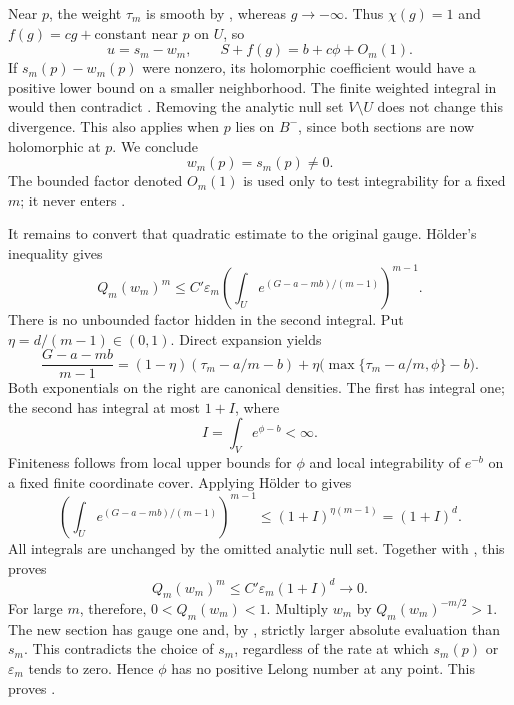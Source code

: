 Near $p$, the weight $\tau_m$ is smooth by
, whereas $g\to-\infty$.  Thus $\chi(g)=1$
and $f(g)=cg+\text{constant}$ near $p$ on $U$, so
\[
 u=s_m-w_m,\qquad S+f(g)=b+c\phi+O_m(1).
\]
If $s_m(p)-w_m(p)$ were nonzero, its holomorphic coefficient would
have a positive lower bound on a smaller neighborhood.  The finite
weighted integral in  would then
contradict .  Removing the analytic
null set $V\setminus U$ does not change this divergence.  This also
applies when $p$ lies on $B^-$, since both sections are now holomorphic
at $p$.  We conclude
\begin{equation}\label{eq:competitor-value}
 w_m(p)=s_m(p)\ne0.
\end{equation}
The bounded factor denoted $O_m(1)$ is used only to test integrability
for a fixed $m$; it never enters .

It remains to convert that quadratic estimate to the original gauge.
H\"older's inequality gives
\begin{equation}\label{eq:gauge-holder-first}
 Q_m(w_m)^m\le C'\varepsilon_m
 \left(\int_U e^{(G-a-mb)/(m-1)}\right)^{m-1}.
\end{equation}
There is no unbounded factor hidden in the second integral.  Put
$\eta=d/(m-1)\in(0,1)$.  Direct expansion yields
\begin{equation}\label{eq:canonical-density-mixture}
 \frac{G-a-mb}{m-1}
 =(1-\eta)(\tau_m-a/m-b)
  +\eta\bigl(\max\{\tau_m-a/m,\phi\}-b\bigr).
\end{equation}
Both exponentials on the right are canonical densities.  The first
has integral one; the second has integral at most $1+I$, where
\[
 I=\int_V e^{\phi-b}<\infty.
\]
Finiteness follows from local upper bounds for $\phi$ and local
integrability of $e^{-b}$ on a fixed finite coordinate cover.
Applying H\"older to  gives
\[
 \left(\int_U e^{(G-a-mb)/(m-1)}\right)^{m-1}
 \le (1+I)^{\eta(m-1)}=(1+I)^d.
\]
All integrals are unchanged by the omitted analytic null set.
Together with , this proves
\[
 Q_m(w_m)^m\le C'\varepsilon_m(1+I)^d\longrightarrow0.
\]
For large $m$, therefore, $0<Q_m(w_m)<1$.  Multiply $w_m$ by
$Q_m(w_m)^{-m/2}>1$.  The new section has gauge one and, by
, strictly larger absolute evaluation than
$s_m$.  This contradicts the choice of $s_m$, regardless of the rate
at which $s_m(p)$ or $\varepsilon_m$ tends to zero.  Hence $\phi$ has
no positive Lelong number at any point.  This proves
.


